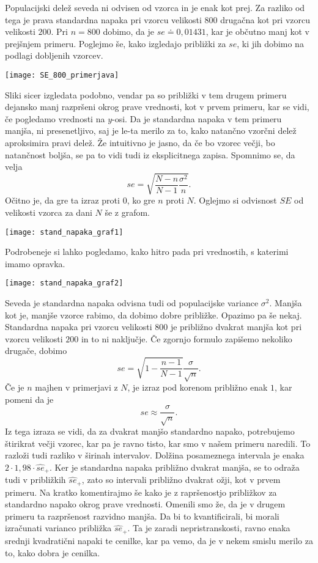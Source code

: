 \documentclass[12pt, letterpaper]{article}
\begin{document}
Populacijski delež seveda ni odvisen od vzorca in je enak kot prej. Za razliko od tega je prava standardna napaka pri vzorcu velikosti $800$ drugačna kot pri vzorcu velikosti $200$. Pri $n=800$ dobimo, da je $se \doteq 0,01431$, kar je občutno manj kot v prejšnjem primeru.
Poglejmo še, kako izgledajo približki za $se$, ki jih dobimo na podlagi dobljenih vzorcev.
\begin{center}
\texttt{[image: SE\_800\_primerjava]}
\end{center}
Sliki sicer izgledata podobno, vendar pa so približki v tem drugem primeru dejansko manj razpršeni okrog prave vrednosti, kot v prvem primeru, kar se vidi, če pogledamo vrednosti na $y$-osi. Da je standardna napaka v tem primeru manjša, ni presenetljivo, saj je le-ta merilo za to, kako natančno vzorčni delež aproksimira pravi delež. Že intuitivno je jasno, da če bo vzorec večji, bo natančnost boljša, se pa to vidi tudi iz eksplicitnega zapisa. Spomnimo se, da velja
\[
se = \sqrt{\frac{N-n}{N-1}\frac{\sigma^2}{n}}.
\]
Očitno je, da gre ta izraz proti $0$, ko gre $n$ proti $N$. Oglejmo si odvisnost $SE$ od velikosti vzorca za dani $N$ še z grafom.
\begin{center}
\texttt{[image: stand\_napaka\_graf1]}
\end{center}
Podrobeneje si lahko pogledamo, kako hitro pada pri vrednostih, s katerimi imamo opravka.
\begin{center}
\texttt{[image: stand\_napaka\_graf2]}
\end{center}
Seveda je standardna napaka odvisna tudi od populacijske variance $\sigma^2$. Manjša kot je, manjše vzorce rabimo, da dobimo dobre približke. Opazimo pa še nekaj. Standardna napaka pri vzorcu velikosti $800$ je približno dvakrat manjša kot pri vzorcu velikosti $200$ in to ni naključje. Če zgornjo formulo zapišemo nekoliko drugače, dobimo
\[
se = \sqrt{1 - \frac{n-1}{N-1}}\frac{\sigma}{\sqrt{n}}.
\]
Če je $n$ majhen v primerjavi z $N$, je izraz pod korenom približno enak $1$, kar pomeni da je
\[
se \approx \frac{\sigma}{\sqrt{n}}.
\]
Iz tega izraza se vidi, da za dvakrat manjšo standardno napako, potrebujemo štirikrat večji vzorec, kar pa je ravno tisto, kar smo v našem primeru naredili. To razloži tudi razliko v širinah intervalov. Dolžina posameznega intervala je enaka $2\cdot1,98\cdot\hat{se}_+$. Ker je standardna napaka približno dvakrat manjša, se to odraža tudi v približkih $\hat{se}_+$, zato so intervali približno dvakrat ožji, kot v prvem primeru. Na kratko komentirajmo še kako je z rapršenostjo približkov za standardno napako okrog prave vrednosti. Omenili smo že, da je v drugem primeru ta razpršenost razvidno manjša. Da bi to kvantificirali, bi morali izračunati varianco približka $\hat{se}_+$. Ta je zaradi nepristranskosti, ravno enaka srednji kvadratični napaki te cenilke, kar pa vemo, da je v nekem smislu merilo za to, kako dobra je cenilka.
\end{document}
